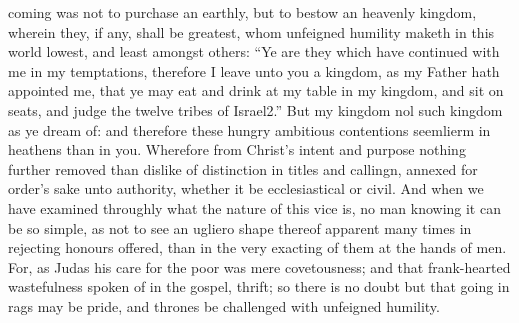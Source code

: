 coming was not to purchase an earthly, but to bestow an heavenly kingdom, wherein they, if any, shall be greatest, whom unfeigned humility maketh in this world lowest, and least amongst others: “Ye are they which have continued with me in my temptations, therefore I leave unto you a kingdom, as my Father hath appointed me, that ye may eat and drink at my table in my kingdom, and sit on seats, and judge the twelve tribes of Israel2.” But my kingdom nol such kingdom as ye dream of: and therefore these hungry ambitious contentions seemlierm in heathens than in you. Wherefore from Christ’s intent and purpose nothing further removed than dislike of distinction in titles and callingn, annexed for order’s sake unto authority, whether it be ecclesiastical or civil. And when we have examined throughly what the nature of this vice is, no man knowing it can be so simple, as not to see an ugliero shape thereof apparent many times in rejecting honours offered, than in the very exacting of them at the hands of men. For, as Judas his care for the poor was mere covetousness; and that frank-hearted wastefulness spoken of in the gospel, thrift; so there is no doubt but that going in rags may be pride, and thrones be challenged with unfeigned humility.

